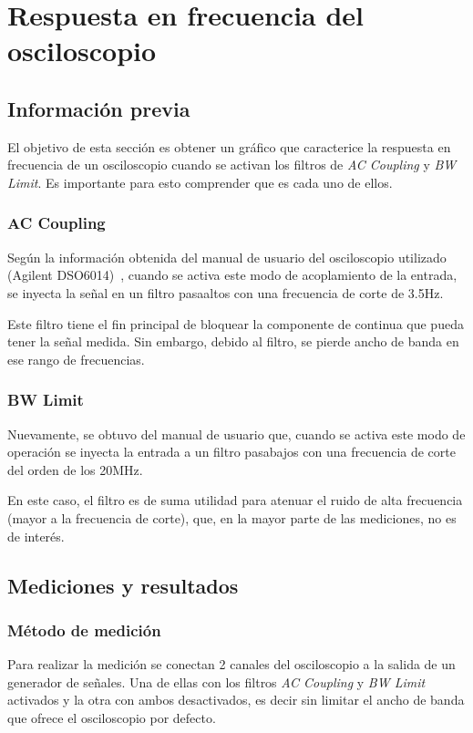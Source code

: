 \section{Respuesta en frecuencia del osciloscopio}

\subsection{Informaci\'on previa}

El objetivo de esta secci\'on es obtener un gr\'afico que caracterice la respuesta en frecuencia de un osciloscopio cuando se activan los filtros de \textit{AC Coupling} y \textit{BW Limit}. Es importante para esto comprender que es cada uno de ellos.

\subsubsection{AC Coupling}

Seg\'un la informaci\'on obtenida del manual de usuario del osciloscopio utilizado (Agilent DSO6014)\ , cuando se activa  este modo de acoplamiento de la entrada, se inyecta la se\~nal en un filtro pasaaltos con una frecuencia de corte de 3.5Hz. 

Este filtro tiene el fin principal de bloquear la componente de continua que pueda tener la se\~nal medida. Sin embargo, debido al filtro, se pierde ancho de banda en ese rango de frecuencias.

\subsubsection{BW Limit}
Nuevamente, se obtuvo del manual de usuario que, cuando se activa este modo de operaci\'on se inyecta la entrada a un filtro pasabajos con una frecuencia de corte del orden de los 20MHz.

En este caso, el filtro es de suma utilidad para atenuar el ruido de alta frecuencia (mayor a la frecuencia de corte), que, en la mayor parte de las mediciones, no es de inter\'es.

\subsection{Mediciones y resultados}
\subsubsection{M\'etodo de medici\'on}
Para realizar la medici\'on se conectan 2 canales del osciloscopio a la salida de un generador de se\~nales. Una de ellas con los filtros \textit{AC Coupling} y \textit{BW Limit} activados y la otra con ambos desactivados, es decir sin limitar el ancho de banda que ofrece el osciloscopio por defecto.

